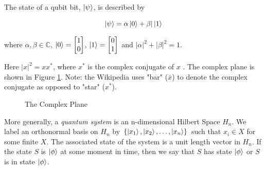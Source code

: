 \documentclass{article}
\theoremstyle{definition}
\begin{document}
\bigskip
\noindent
The state of a qubit bit, $\ket{\psi}$,  is described by

\begin{equation*}
\ket{\psi}   = \alpha \ket{0} + \beta | \ket{1}
\end{equation*}

\bigskip
\noindent
where $\alpha, \beta \in \mathbb{C}$, $\ket{0} =
\begin{bmatrix} 1 \\ 0 \end{bmatrix}$, $\ket{1}  =
\begin{bmatrix} 0 \\ 1 \end{bmatrix}$ and 
$|\alpha|^2 + |\beta|^2 = 1$.


\bigskip
\noindent
Here $|x|^2 = xx^*$, where $x^*$ is the complex conjugate of $x$
\cite{wiki:complex_conjugate}. The complex plane is shown in
Figure \ref{fig:complex_plane_wiki}. Note: the Wikipedia uses
"bar" ($\bar{x}$) to denote the complex conjugate as opposed to
"star" ($x^*$).

\begin{figure}
\caption{The Complex Plane \cite{wiki:complex_plane}}
\label{fig:complex_plane_wiki}
\end{figure}

\bigskip
\noindent
More generally, a \emph{quantum system} is an n-dimensional
Hilbert Space $H_n$. We label an orthonormal basis on $H_n$ by
$\{\ket{x_1}, \ket{x_2}, \hdots, \ket{x_n}\}$ such that $x_i \in
X$ for some finite $X$. The associated state of the system is a
unit length vector in $H_n$. If the state $S$ is $\ket{\phi}$ at
some moment in time, then we say that $S$ has state $\ket{\phi}$
or $S$ is in state $\ket{\phi}$.
 
\end{document}
